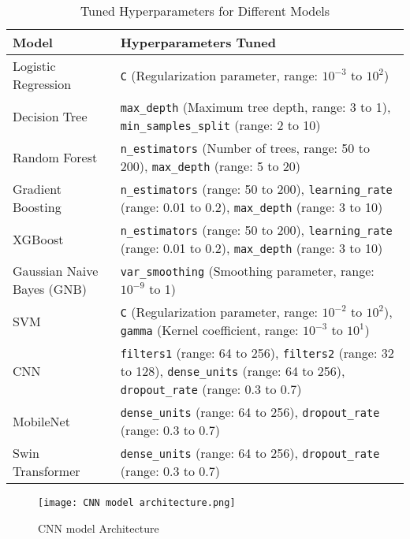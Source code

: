 \documentclass[runningheads]{llncs}
\begin{document}
\begin{table}[ht]
\caption{Tuned Hyperparameters for Different Models}
\centering
\begin{tabular}{|l|p{7cm}|}
\hline
\textbf{Model} & \textbf{Hyperparameters Tuned} \\
\hline
Logistic Regression & \texttt{C} (Regularization parameter, range: $10^{-3}$ to $10^{2}$) \\
\hline
Decision Tree & \texttt{max\_depth} (Maximum tree depth, range: 3 to 1), \texttt{min\_samples\_split} (range: 2 to 10) \\
\hline
Random Forest & \texttt{n\_estimators} (Number of trees, range: 50 to 200), \texttt{max\_depth} (range: 5 to 20) \\
\hline
Gradient Boosting & \texttt{n\_estimators} (range: 50 to 200), \texttt{learning\_rate} (range: 0.01 to 0.2), \texttt{max\_depth} (range: 3 to 10) \\
\hline
XGBoost & \texttt{n\_estimators} (range: 50 to 200), \texttt{learning\_rate} (range: 0.01 to 0.2), \texttt{max\_depth} (range: 3 to 10) \\
\hline
Gaussian Naive Bayes (GNB) & \texttt{var\_smoothing} (Smoothing parameter, range: $10^{-9}$ to 1) \\
\hline
SVM & \texttt{C} (Regularization parameter, range: $10^{-2}$ to $10^{2}$), \texttt{gamma} (Kernel coefficient, range: $10^{-3}$ to $10^{1}$) \\
\hline
CNN & \texttt{filters1} (range: 64 to 256), \texttt{filters2} (range: 32 to 128), \texttt{dense\_units} (range: 64 to 256), \texttt{dropout\_rate} (range: 0.3 to 0.7) \\
\hline
MobileNet & \texttt{dense\_units} (range: 64 to 256), \texttt{dropout\_rate} (range: 0.3 to 0.7) \\
\hline
Swin Transformer & \texttt{dense\_units} (range: 64 to 256), \texttt{dropout\_rate} (range: 0.3 to 0.7) \\
\hline
\end{tabular}

\label{tab:hyperparameters}
\end{table}


\begin{figure}
    \centering
    \texttt{[image: CNN model architecture.png]}
    \caption{CNN model Architecture}
    \label{fig:enter-label}
\end{figure}
\end{document}
